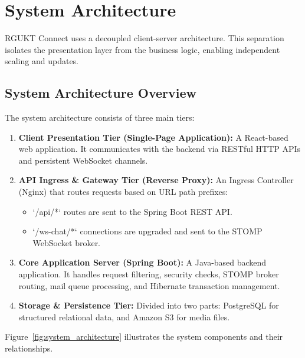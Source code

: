 \chapter{System Architecture}
\label{ch:architecture}

RGUKT Connect uses a decoupled client-server architecture. This separation isolates the presentation layer from the business logic, enabling independent scaling and updates.

\section{System Architecture Overview}
The system architecture consists of three main tiers:
\begin{enumerate}
    \item \textbf{Client Presentation Tier (Single-Page Application):} A React-based web application. It communicates with the backend via RESTful HTTP APIs and persistent WebSocket channels.
    \item \textbf{API Ingress \& Gateway Tier (Reverse Proxy):} An Ingress Controller (Nginx) that routes requests based on URL path prefixes:
    \begin{itemize}
        \item `/api/*` routes are sent to the Spring Boot REST API.
        \item `/ws-chat/*` connections are upgraded and sent to the STOMP WebSocket broker.
    \end{itemize}
    \item \textbf{Core Application Server (Spring Boot):} A Java-based backend application. It handles request filtering, security checks, STOMP broker routing, mail queue processing, and Hibernate transaction management.
    \item \textbf{Storage \& Persistence Tier:} Divided into two parts: PostgreSQL for structured relational data, and Amazon S3 for media files.
\end{enumerate}

Figure~\ref{fig:system_architecture} illustrates the system components and their relationships.

